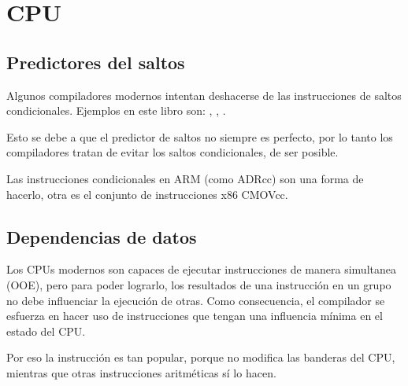 ﻿\section{CPU}

\subsection{Predictores del saltos}
\label{branch_predictors}

Algunos compiladores modernos intentan deshacerse de las instrucciones de saltos condicionales.
Ejemplos en este libro son: , , .

Esto se debe a que el predictor de saltos no siempre es perfecto, por lo tanto los compiladores
tratan de evitar los saltos condicionales, de ser posible.

Las instrucciones condicionales en ARM (como ADRcc) son una forma de hacerlo, otra es el conjunto de instrucciones x86 CMOVcc.

\subsection{Dependencias de datos}

Los CPUs modernos son capaces de ejecutar instrucciones de manera simultanea (\ac{OOE}), pero para
poder lograrlo, los resultados de una instrucci\'on en un grupo no debe influenciar la ejecuci\'on de otras.
Como consecuencia, el compilador se esfuerza en hacer uso de instrucciones que tengan una influencia m\'inima en el estado del CPU.

Por eso la instrucci\'on \LEA es tan popular, porque no modifica las banderas del CPU, mientras que otras instrucciones aritm\'eticas s\'i lo hacen.
